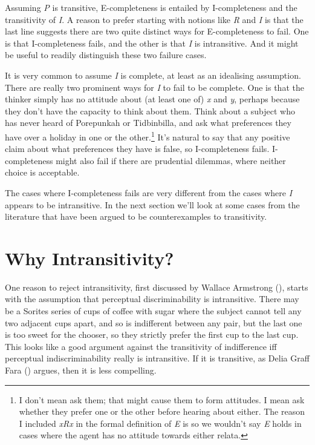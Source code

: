 \documentclass[
  11pt,
  letterpaper,
  DIV=11,
  numbers=noendperiod,
  twoside]{scrartcl}
\begin{document}
Assuming \emph{P} is transitive, E-completeness is entailed by
I-completeness and the transitivity of \emph{I}. A reason to prefer
starting with notions like \emph{R} and \emph{I} is that the last line
suggests there are two quite distinct ways for E-completeness to fail.
One is that I-completeness fails, and the other is that \emph{I} is
intransitive. And it might be useful to readily distinguish these two
failure cases.

It is very common to assume \emph{I} is complete, at least as an
idealising assumption. There are really two prominent ways for \emph{I}
to fail to be complete. One is that the thinker simply has no attitude
about (at least one of) \emph{x} and \emph{y}, perhaps because they
don't have the capacity to think about them. Think about a subject who
has never heard of Porepunkah or Tidbinbilla, and ask what preferences
they have over a holiday in one or the other.\footnote{I don't mean ask
  them; that might cause them to form attitudes. I mean ask whether they
  prefer one or the other before hearing about either. The reason I
  included \emph{xRx} in the formal definition of \emph{E} is so we
  wouldn't say \emph{E} holds in cases where the agent has no attitude
  towards either relata.} It's natural to say that any positive claim
about what preferences they have is false, so I-completeness fails.
I-completeness might also fail if there are prudential dilemmas, where
neither choice is acceptable.

The cases where I-completeness fails are very different from the cases
where \emph{I} appears to be intransitive. In the next section we'll
look at some cases from the literature that have been argued to be
counterexamples to transitivity.

\section{Why Intransitivity?}\label{sec-intransitivity}

One reason to reject intransitivity, first discussed by Wallace
Armstrong (), starts with the
assumption that perceptual discriminability is intransitive. There may
be a Sorites series of cups of coffee with sugar where the subject
cannot tell any two adjacent cups apart, and so is indifferent between
any pair, but the last one is too sweet for the chooser, so they
strictly prefer the first cup to the last cup. This looks like a good
argument against the transitivity of indifference iff perceptual
indiscriminability really is intransitive. If it is transitive, as Delia
Graff Fara () argues, then it is less
compelling.
\end{document}

